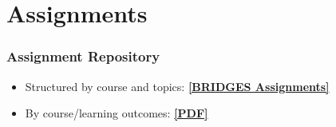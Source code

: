 \documentclass[aspectratio=169]{beamer}
\begin{document}
\section{Assignments}

\begin{frame}
  \frametitle{Assignment Repository}

\begin{itemize}
	\item Structured by course and topics: 
  \href{http://bridgesuncc.github.io/newassignments.html}{\color{purple} \bf [BRIDGES Assignments]}
	\item  By course/learning outcomes:
	\href{../assignment_groups/assignmentgroups.pdf}{\color{purple}\bf [PDF]}
\end{itemize}

  

\end{frame}
\end{document}
